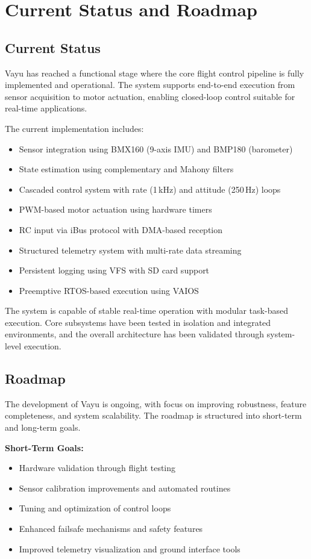 \section{Current Status and Roadmap}
\label{sec:vayu_roadmap}

\subsection{Current Status}

Vayu has reached a functional stage where the core flight control pipeline is fully implemented and operational. The system supports end-to-end execution from sensor acquisition to motor actuation, enabling closed-loop control suitable for real-time applications.

The current implementation includes:
\begin{itemize}
    \item Sensor integration using BMX160 (9-axis IMU) and BMP180 (barometer)
    \item State estimation using complementary and Mahony filters
    \item Cascaded control system with rate (1\,kHz) and attitude (250\,Hz) loops
    \item PWM-based motor actuation using hardware timers
    \item RC input via iBus protocol with DMA-based reception
    \item Structured telemetry system with multi-rate data streaming
    \item Persistent logging using VFS with SD card support
    \item Preemptive RTOS-based execution using VAIOS
\end{itemize}

The system is capable of stable real-time operation with modular task-based execution. Core subsystems have been tested in isolation and integrated environments, and the overall architecture has been validated through system-level execution.

\subsection{Roadmap}

The development of Vayu is ongoing, with focus on improving robustness, feature completeness, and system scalability. The roadmap is structured into short-term and long-term goals.

\textbf{Short-Term Goals:}
\begin{itemize}
    \item Hardware validation through flight testing
    \item Sensor calibration improvements and automated routines
    \item Tuning and optimization of control loops
    \item Enhanced failsafe mechanisms and safety features
    \item Improved telemetry visualization and ground interface tools
\end{itemize}

